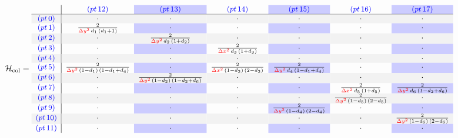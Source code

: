 \documentclass[10pt,a4paper, landscape]{article}
\newcommand{\pnormal}[1]{\textcolor{blue}{(pt\,#1)}}
\newcommand{\pgray}[1]{\rowcolor{gray!10}\textcolor{blue}{(pt\,#1)}}
\newcommand{\coeff}[3]{\frac{2}{\textcolor{red}{#1}\,#2\,#3}}
\newcommand{\dx}{\Delta x}
\newcommand{\dy}{\Delta y}
\begin{document}
\begin{equation*}\small
\mathcal{H}_{\text{col}} = 
\begin{array}{c|c>{\columncolor{blue!20}}cc>{\columncolor{blue!20}}cc>{\columncolor{blue!20}}c}
& \pnormal{12} & \pnormal{13} & \pnormal{14} & \pnormal{15} & \pnormal{16} & \pnormal{17}\\
\hline
\pgray{0} & \cdot & \cdot & \cdot & \cdot & \cdot & \cdot \\
\pnormal{1} & \coeff{\dy^2}{d_1}{(d_1+1)} & \cdot & \cdot & \cdot & \cdot & \cdot \\
\pgray{2} & \cdot & \coeff{\dy^2}{d_2}{(1+d_2)} & \cdot & \cdot & \cdot & \cdot \\
\pnormal{3} & \cdot & \cdot & \coeff{\dx^2}{d_3}{(1+d_3)} & \cdot & \cdot & \cdot \\
\pgray{4} & \cdot & \cdot & \cdot & \cdot & \cdot & \cdot \\
\pnormal{5} & \coeff{\dy^2}{(1-d_1)}{(1-d_1+d_4)} & \cdot & \coeff{\dx^2}{(1-d_3)}{(2-d_3)} & \coeff{\dy^2}{d_4}{(1-d_1+d_4)} & \cdot & \cdot \\
\pgray{6} & \cdot & \coeff{\dy^2}{(1-d_2)}{(1-d_2+d_6)} & \cdot & \cdot & \cdot & \cdot \\
\pnormal{7} & \cdot & \cdot & \cdot & \cdot & \coeff{\dx^2}{d_5}{(1+d_5)} & \coeff{\dy^2}{d_6}{(1-d_2+d_6)} \\
\pgray{8} & \cdot & \cdot & \cdot & \cdot & \coeff{\dy^2}{(1-d_5)}{(2-d_5)} & \cdot \\
\pnormal{9} & \cdot & \cdot & \cdot & \coeff{\dy^2}{(1-d_4)}{(2-d_4)} & \cdot & \cdot \\
\pgray{10} & \cdot & \cdot & \cdot & \cdot & \cdot & \coeff{\dy^2}{(1-d_6)}{(2-d_6)} \\
\pnormal{11} & \cdot & \cdot & \cdot & \cdot & \cdot & \cdot
\end{array}
\end{equation*}
\newpage
\end{document}
